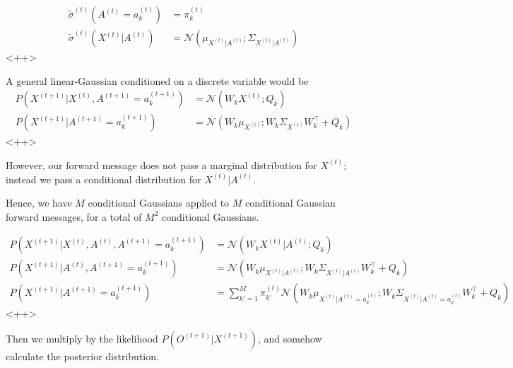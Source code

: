 \documentclass[a4paper]{article}
\begin{document}
\begin{equation}
  \begin{split}
    \tilde{\sigma}^{(t)} \left( A^{(t)} = a_k^{(t)} \right) &= \pi_k^{(t)} \\
    \tilde{\sigma}^{(t)} \left( X^{(t)} \vert A^{(t)} \right) &= \mathcal{N} \left( \mu_{X^{(t)} \vert A^{(t)} } ; \Sigma_{ X^{(t)} \vert A^{(t)} } \right) 
  \end{split}
  \label{<++>}
\end{equation}<++>

A general linear-Gaussian conditioned on a discrete variable would be
\begin{equation}
  \begin{split}
    P \left( X^{(t+1)} \vert X^{(t)}, A^{(t+1)} = a_k^{(t+1)} \right) &= \mathcal{N} \left( W_k X^{(t)} ; Q_k \right) \\
    P \left( X^{(t+1)} \vert A^{(t+1)} = a_k^{(t+1)} \right) &= \mathcal{N} \left( W_k \mu_{X^{(t)} } ; W_k \Sigma_{X^{(t)}} W_k^{\intercal} + Q_k \right)
  \end{split}
  \label{<++>}
\end{equation}<++>

However, our forward message does not pass a marginal distribution for $X^{(t)}$; instead we pass a conditional distribution for $X^{(t)} \vert A^{(t)}$.

Hence, we have $M$ conditional Gaussians applied to $M$ conditional Gaussian forward messages, for a total of $M^2$ conditional Gaussians.

\begin{equation}
  \begin{split}
    P \left( X^{(t+1)} \vert X^{(t)}, A^{(t)}, A^{(t+1)} = a_k^{(t+1)} \right) &= \mathcal{N} \left( W_k X^{(t)} \vert A^{(t)}; Q_k \right) \\
    P \left( X^{(t+1)} \vert A^{(t)}, A^{(t+1)} = a_k^{(t+1)} \right) &= \mathcal{N} \left( W_k \mu_{X^{(t)} \vert A^{(t)}} ; W_k \Sigma_{X^{(t)} \vert A^{(t)}} W_k^{\intercal} + Q_k \right) \\
    P \left( X^{(t+1)} \vert A^{(t+1)} = a_k^{(t+1)} \right) &= \sum_{k' = 1}^M \pi_{k'}^{(t)} \mathcal{N} \left( W_k \mu_{X^{(t)} \vert A^{(t)} = a_{k'}^{(t)} } ; W_k \Sigma_{X^{(t)} \vert A^{(t)} = a_{k'}^{(t)} } W_k^{\intercal} + Q_k \right)
  \end{split}
  \label{<++>}
\end{equation}<++>

Then we multiply by the likelihood $P \left( O^{(t+1)} \vert X^{(t+1)} \right)$, and somehow calculate the posterior distribution.
\end{document}
